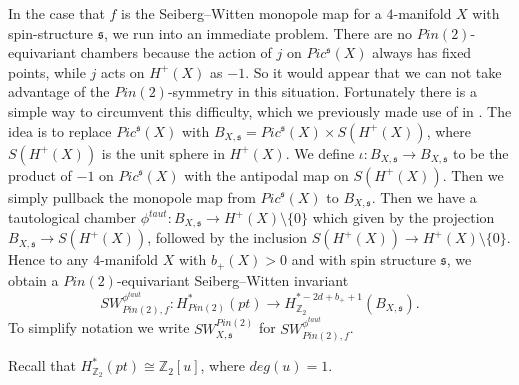 \documentclass{amsart}
\theoremstyle{definition}
\theoremstyle{remark}
\numberwithin{equation}{section}
\begin{document}
In the case that $f$ is the Seiberg--Witten monopole map for a $4$-manifold $X$ with spin-structure $\mathfrak{s}$, we run into an immediate problem. There are no $Pin(2)$-equivariant chambers because the action of $j$ on $Pic^{\mathfrak{s}}(X)$ always has fixed points, while $j$ acts on $H^+(X)$ as $-1$. So it would appear that we can not take advantage of the $Pin(2)$-symmetry in this situation. Fortunately there is a simple way to circumvent this difficulty, which we previously made use of in \cite[]{bk1}. The idea is to replace $Pic^{\mathfrak{s}}(X)$ with $B_{X,\mathfrak{s}} = Pic^{\mathfrak{s}}(X) \times S(H^+(X))$, where $S(H^+(X))$ is the unit sphere in $H^+(X)$. We define $\iota : B_{X,\mathfrak{s}} \to B_{X,\mathfrak{s}}$ to be the product of $-1$ on $Pic^{\mathfrak{s}}(X)$ with the antipodal map on $S(H^+(X))$. Then we simply pullback the monopole map from $Pic^{\mathfrak{s}}(X)$ to $B_{X,\mathfrak{s}}$. Then we have a tautological chamber $\phi^{taut} : B_{X,\mathfrak{s}} \to H^+(X) \setminus \{0\}$ which given by the projection $B_{X,\mathfrak{s}} \to S(H^+(X))$, followed by the inclusion $S(H^+(X)) \to H^+(X) \setminus \{0\}$. Hence to any $4$-manifold $X$ with $b_+(X)>0$ and with spin structure $\mathfrak{s}$, we obtain a $Pin(2)$-equivariant Seiberg--Witten invariant
\[
SW^{\phi^{taut}}_{Pin(2),f} : H^*_{Pin(2)}(pt) \to H^{*-2d+b_++1}_{\mathbb{Z}_2}( B_{X,\mathfrak{s}}).
\]
To simplify notation we write $SW^{Pin(2)}_{X,\mathfrak{s}}$ for $SW^{\phi^{taut}}_{Pin(2),f}$.

Recall that $H^*_{\mathbb{Z}_2}(pt) \cong \mathbb{Z}_2[u]$, where $deg(u) = 1$.
\end{document}
